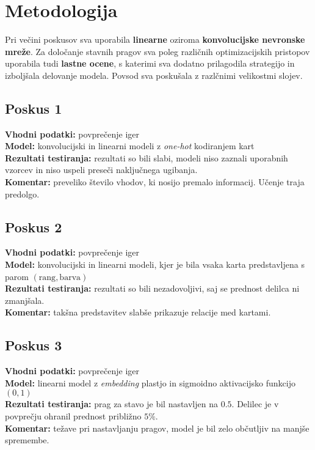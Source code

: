 \documentclass[a4paper,12pt]{article}
\begin{document}
\section{Metodologija}

Pri večini poskusov sva uporabila \textbf{linearne} oziroma 
\textbf{konvolucijske nevronske mreže}. 
Za določanje stavnih pragov sva poleg različnih optimizacijskih pristopov 
uporabila tudi \textbf{lastne ocene}, s katerimi sva dodatno prilagodila 
strategijo in izboljšala delovanje modela. Povsod sva poskušala z razlčnimi velikostmi
slojev.


\subsection{Poskus 1}
\textbf{Vhodni podatki:} povprečenje iger \\
\textbf{Model:} konvolucijski in linearni modeli z \textit{one-hot} kodiranjem kart \\
\textbf{Rezultati testiranja:} rezultati so bili slabi, modeli niso zaznali uporabnih vzorcev in niso uspeli preseči naključnega ugibanja. \\
\textbf{Komentar:} preveliko število vhodov, ki nosijo premalo informacij. Učenje traja predolgo.

\subsection{Poskus 2}
\textbf{Vhodni podatki:} povprečenje iger \\
\textbf{Model:} konvolucijski in linearni modeli, kjer je bila vsaka karta predstavljena s parom $(\text{rang}, \text{barva})$ \\
\textbf{Rezultati testiranja:} rezultati so bili nezadovoljivi, saj se prednost delilca ni zmanjšala. \\
\textbf{Komentar:} takšna predstavitev slabše prikazuje relacije med kartami.

\subsection{Poskus 3}
\textbf{Vhodni podatki:} povprečenje iger \\
\textbf{Model:} linearni model z \textit{embedding} plastjo in sigmoidno aktivacijsko funkcijo $(0,1)$ \\
\textbf{Rezultati testiranja:} prag za stavo je bil nastavljen na $0.5$. Delilec je v povprečju ohranil prednost približno $5\%$. \\
\textbf{Komentar:} težave pri nastavljanju pragov, model je bil zelo občutljiv na manjše spremembe.
\end{document}
